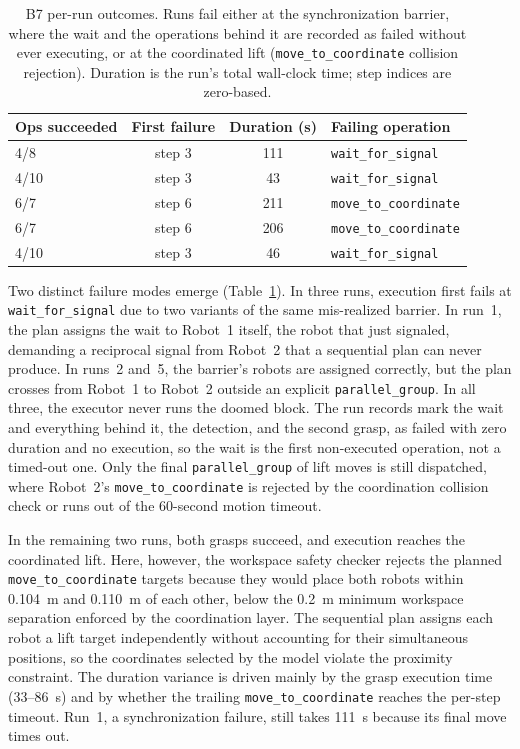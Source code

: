 \begin{table}[t]
	\centering
	\begin{tabular}{lccl}
		\textbf{Ops succeeded} & \textbf{First failure}     &
		\textbf{Duration (s)}  & \textbf{Failing operation}                                       \\
		\hline
		4/8                    & step 3                     & 111 & \texttt{wait\_for\_signal}    \\
		4/10                   & step 3                     & 43  & \texttt{wait\_for\_signal}    \\
		6/7                    & step 6                     & 211 & \texttt{move\_to\_coordinate} \\
		6/7                    & step 6                     & 206 & \texttt{move\_to\_coordinate} \\
		4/10                   & step 3                     & 46  & \texttt{wait\_for\_signal}    \\
		\hline
	\end{tabular}
	\caption{B7 per-run outcomes. Runs fail either at the synchronization barrier, where the wait and the operations behind it are recorded as failed without ever executing, or at the coordinated lift (\texttt{move\_to\_coordinate} collision rejection). Duration is the run’s total wall-clock time; step indices are zero-based.}
	\label{tab:b7-outcomes}
\end{table}

Two distinct failure modes emerge (Table~\ref{tab:b7-outcomes}). In three runs, execution first fails at \texttt{wait\_for\_signal} due to two variants of the same mis-realized barrier. In run~1, the plan assigns the wait to Robot~1 itself, the robot that just signaled, demanding a reciprocal signal from Robot~2 that a sequential plan can never produce. In runs~2 and~5, the barrier’s robots are assigned correctly, but the plan crosses from Robot~1 to Robot~2 outside an explicit \texttt{parallel\_group}. In all three, the executor never runs the doomed block. The run records mark the wait and everything behind it, the detection, and the second grasp, as failed with zero duration and no execution, so the wait is the first non-executed operation, not a timed-out one. Only the final \texttt{parallel\_group} of lift moves is still dispatched, where Robot~2’s \texttt{move\_to\_coordinate} is rejected by the coordination collision check or runs out of the 60-second motion timeout.

In the remaining two runs, both grasps succeed, and execution reaches the coordinated lift. Here, however, the workspace safety checker rejects the planned \texttt{move\_to\_coordinate} targets because they would place both robots within 0.104~m and 0.110~m of each other, below the 0.2~m minimum workspace separation enforced by the coordination layer. The sequential plan assigns each robot a lift target independently without accounting for their simultaneous positions, so the coordinates selected by the model violate the proximity constraint. The duration variance is driven mainly by the grasp execution time (33–86~s) and by whether the trailing \texttt{move\_to\_coordinate} reaches the per-step timeout. Run~1, a synchronization failure, still takes 111~s because its final move times out.

